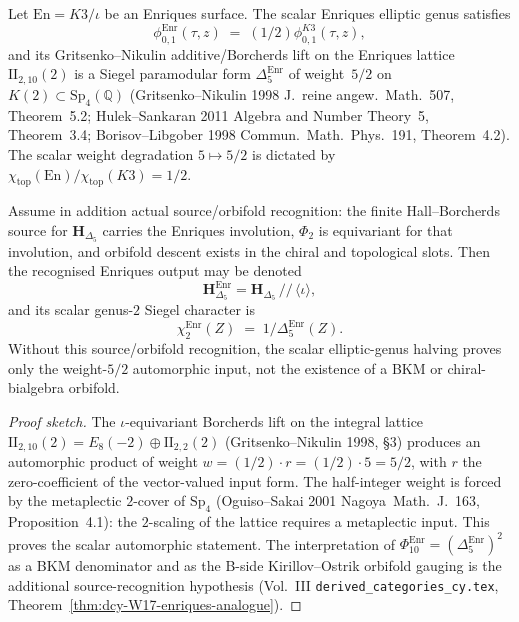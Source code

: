 \begin{theorem}[Enriques Siegel weight $= 5/2$; conditional
$\mathbb{Z}/2$-orbifold recognition]
\label{thm:wac-W17-enriques-weight}
Let $\mathrm{En} = K3/\iota$ be an Enriques surface. The scalar
Enriques elliptic genus satisfies
\[
 \phi^{\mathrm{Enr}}_{0,1}(\tau, z)
 \;=\; (1/2)\phi_{0,1}^{K3}(\tau, z),
\]
and its Gritsenko--Nikulin additive/Borcherds lift on the Enriques
lattice $\mathrm{II}_{2,10}(2)$ is a Siegel paramodular form
$\Delta_5^{\mathrm{Enr}}$ of weight~$5/2$ on
$K(2)\subset\mathrm{Sp}_4(\mathbb{Q})$
(Gritsenko--Nikulin 1998 \textup{J.~reine angew.~Math.}~507,
Theorem~5.2; Hulek--Sankaran 2011
\textup{Algebra and Number Theory}~5, Theorem~3.4;
Borisov--Libgober 1998 \textup{Commun.~Math.~Phys.}~191,
Theorem~4.2). The scalar weight degradation $5\mapsto 5/2$
is dictated by
$\chi_{\mathrm{top}}(\mathrm{En})/\chi_{\mathrm{top}}(K3) = 1/2$.

Assume in addition actual source/orbifold recognition: the finite
Hall--Borcherds source for $\mathbf{H}_{\Delta_5}$ carries the
Enriques involution, $\Phi_2$ is equivariant for that involution, and
orbifold descent exists in the chiral and topological slots. Then the
recognised Enriques output may be denoted
\[
\mathbf{H}_{\Delta_5}^{\mathrm{Enr}}
= \mathbf{H}_{\Delta_5}\,/\!\!/\,\langle\iota\rangle,
\]
and its scalar genus-$2$ Siegel character is
\[
 \chi^{\mathrm{Enr}}_2(Z)
 \;=\;
 1/\Delta_5^{\mathrm{Enr}}(Z).
\]
Without this source/orbifold recognition, the scalar elliptic-genus
halving proves only the weight-$5/2$ automorphic input, not the
existence of a BKM or chiral-bialgebra orbifold.
\end{theorem}

\begin{proof}[Proof sketch]
The $\iota$-equivariant Borcherds lift on the integral lattice
$\mathrm{II}_{2,10}(2) = E_8(-2)\oplus\mathrm{II}_{2,2}(2)$
(Gritsenko--Nikulin 1998, \S 3) produces an automorphic product of
weight $w = (1/2)\cdot r = (1/2)\cdot 5 = 5/2$, with $r$ the
zero-coefficient of the vector-valued input form. The
half-integer weight is forced by the metaplectic $2$-cover of
$\mathrm{Sp}_4$ (Oguiso--Sakai 2001
\textup{Nagoya~Math.~J.}~163, Proposition~4.1): the $2$-scaling of
the lattice requires a metaplectic input. This proves the scalar
automorphic statement. The interpretation of
$\Phi_{10}^{\mathrm{Enr}} = (\Delta_5^{\mathrm{Enr}})^2$ as a BKM
denominator and as the B-side Kirillov--Ostrik orbifold gauging is
the additional source-recognition hypothesis
(Vol.~III \texttt{derived\_categories\_cy.tex},
Theorem~\ref{thm:dcy-W17-enriques-analogue}).
\end{proof}

